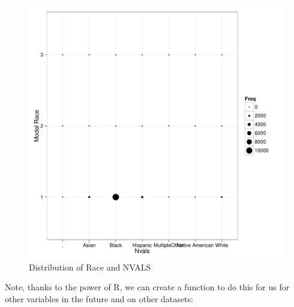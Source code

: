 \documentclass[12pt]{article}
\newenvironment{knitrout}{}{} %
\renewenvironment{knitrout}{\begin{footnotesize}}{\end{footnotesize}}
\begin{document}
\begin{knitrout}
\begin{figure}[]
{\centering \includegraphics[width=.8\textwidth,height=.2\paperheight]{figure/dotplot} 

}

\caption[Distribution of Race and NVALS]{Distribution of Race and NVALS\label{fig:dotplot}}
\end{figure}

\end{knitrout}


Note, thanks to the power of R, we can create a function to do this for us for other variables in the future and on other datasets:
\end{document}

